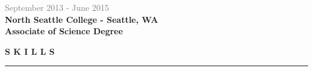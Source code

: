 \documentclass[letterpage]{article}
\begin{document}
\begin{minipage}[t]{0.424\linewidth}
\textcolor{gray}{September 2013 - June 2015}\\
\textbf{\textsf{North Seattle College - Seattle, WA}}\\
\textbf{Associate of Science Degree }

\vspace{19px}

\textbf{\fontsize{14px}{1px}\selectfont S K I L L S}\\
\noindent\rule{2.45in}{0.1pt}
\vspace{0px}\\
\begin{minipage}[t]{0.01\linewidth}
\end{minipage}
\: %


\end{minipage}
\end{document}
